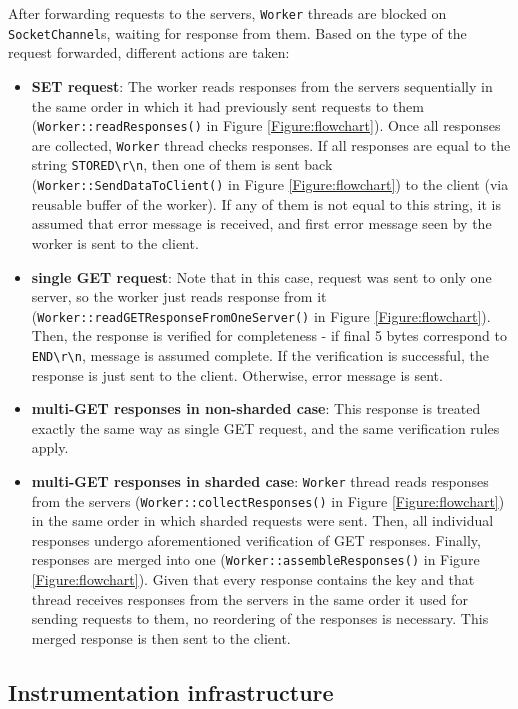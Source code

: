 \documentclass[11pt,a4paper]{article}
\begin{document}
After forwarding requests to the servers, \texttt{Worker} threads are blocked on \texttt{SocketChannel}s, waiting for response from them. Based on the type of the request forwarded, different actions are taken:
\begin{itemize}
	\item \textbf{SET request}: The worker reads responses from the servers sequentially in the same order in which it had previously sent requests to them (\texttt{Worker::readResponses()} in Figure \ref{Figure:flowchart}). Once all responses are collected, \texttt{Worker} thread checks responses. If all responses are equal to the string \texttt{STORED\textbackslash r\textbackslash n}, then one of them is sent back (\texttt{Worker::SendDataToClient()} in Figure \ref{Figure:flowchart}) to the client (via reusable buffer of the worker). If any of them is not equal to this string, it is assumed that error message is received, and first error message seen by the worker is sent to the client.
	\item \textbf{single GET request}: Note that in this case, request was sent to only one server, so the worker just reads response from it (\texttt{Worker::readGETResponseFromOneServer()} in Figure \ref{Figure:flowchart}). Then, the response is verified for completeness - if final 5 bytes correspond to \texttt{END\textbackslash r\textbackslash n}, message is assumed complete. If the verification is successful, the response is just sent to the client. Otherwise, error message is sent.	
	\item \textbf{multi-GET responses in non-sharded case}: This response is treated exactly the same way as single GET request, and the same verification rules apply.
	\item \textbf{multi-GET responses in sharded case}: \texttt{Worker} thread reads responses from the servers (\texttt{Worker::collectResponses()} in Figure \ref{Figure:flowchart}) in the same order in which sharded requests were sent. Then, all individual responses undergo aforementioned verification of GET responses. Finally, responses are merged into one (\texttt{Worker::assembleResponses()} in Figure \ref{Figure:flowchart}). Given that every response contains the key and that thread receives responses from the servers in the same order it used for sending requests to them, no reordering of the responses is necessary. This merged response is then sent to the client.
\end{itemize} 

\subsection{Instrumentation infrastructure}
\end{document}
